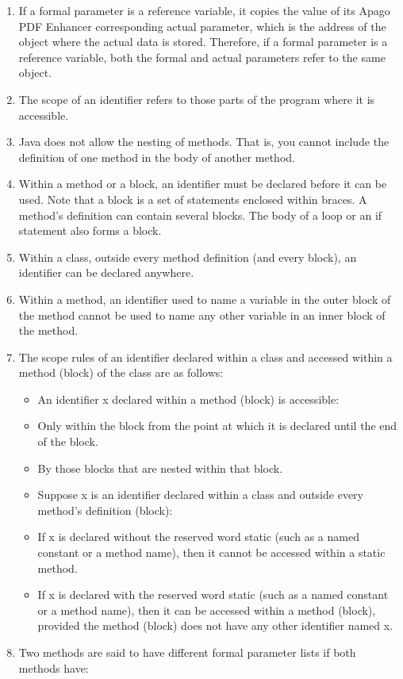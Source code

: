 \documentclass[12pt,a4paper,final,twoside,onecolumn,titlepage]{book}
\begin{document}
\begin{enumerate}
\item If a formal parameter is a reference variable, it copies the value of its Apago PDF Enhancer
corresponding actual parameter, which is the address of the object where the actual data is stored. Therefore, if a formal parameter is a reference variable, both the formal and actual parameters refer to the same object.
\item The scope of an identifier refers to those parts of the program where it is accessible.
\item  Java does not allow the nesting of methods. That is, you cannot include the definition of one method in the body of another method.
\item Within a method or a block, an identifier must be declared before it can be used. Note that a block is a set of statements enclosed within braces. A method’s definition can contain several blocks. The body of a loop or an if statement also forms a block.
\item Within a class, outside every method definition (and every block), an identifier can be declared anywhere.
\item Within a method, an identifier used to name a variable in the outer block of the method cannot be used to name any other variable in an inner block of the method.
\item The scope rules of an identifier declared within a class and accessed within a method (block) of the class are as follows:
\begin{itemize}
\item An identifier x declared within a method (block) is accessible:
\item Only within the block from the point at which it is declared until the end of the block.
\item By those blocks that are nested within that block.
\item Suppose x is an identifier declared within a class and outside every method’s definition (block):
\item If x is declared without the reserved word static (such as a named constant or a method name), then it cannot be accessed within a static method.
\item If x is declared with the reserved word static (such as a named constant or a method name), then it can be accessed within a method (block), provided the method (block) does not have any other identifier named x.
\end{itemize}
\item Two methods are said to have different formal parameter lists if both methods have:

\end{enumerate}
\end{document}
